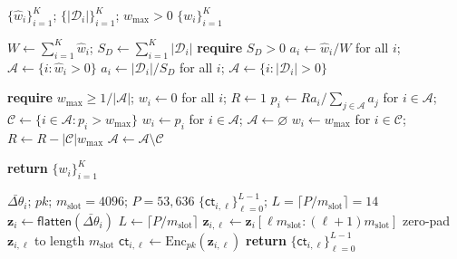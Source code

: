 \documentclass{article}
\begin{document}
\begin{algorithm}[H]
  \caption{\textsc{TrustWeightNorm}}
  \label{alg:trust_weight_norm}
  \begin{algorithmic}[1]
  \REQUIRE $\{\hat w_i\}_{i=1}^{K}$;
  $\{|\mathcal{D}_i|\}_{i=1}^{K}$;
  $w_{\max}>0$
  \ENSURE $\{w_i\}_{i=1}^{K}$

  \STATE $W\leftarrow\sum_{i=1}^{K}\hat w_i$;
  $S_D\leftarrow\sum_{i=1}^{K}|\mathcal D_i|$
  \STATE \textbf{require} $S_D>0$
    \STATE $a_i\leftarrow\hat w_i/W$ for all $i$;
    $\mathcal A\leftarrow\{i:\hat w_i>0\}$
  \ELSE
    \STATE $a_i\leftarrow|\mathcal D_i|/S_D$ for all $i$;
    $\mathcal A\leftarrow\{i:|\mathcal D_i|>0\}$
  \ENDIF

  \STATE \textbf{require} $w_{\max}\geq1/|\mathcal A|$;
  $w_i\leftarrow0$ for all $i$; $R\leftarrow1$
    \STATE $p_i\leftarrow R a_i/\sum_{j\in\mathcal A}a_j$
    for $i\in\mathcal A$;
    $\mathcal C\leftarrow\{i\in\mathcal A:p_i>w_{\max}\}$
      \STATE $w_i\leftarrow p_i$ for $i\in\mathcal A$;
      $\mathcal A\leftarrow\varnothing$
    \ELSE
      \STATE $w_i\leftarrow w_{\max}$ for $i\in\mathcal C$;
      $R\leftarrow R-|\mathcal C|w_{\max}$
      \STATE $\mathcal A\leftarrow\mathcal A\setminus\mathcal C$
    \ENDIF
  \ENDWHILE

  \STATE \textbf{return} $\{w_i\}_{i=1}^{K}$
  \end{algorithmic}
\end{algorithm}

\begin{algorithm}[H]
  \caption{\textsc{CKKSEncryptDelta} at $\mathcal{DC}_i$}
  \label{alg:ckksenc}
  \begin{algorithmic}[1]
  \REQUIRE $\bar{\Delta\theta}_i$; $pk$; $m_{\mathrm{slot}}=4096$; $P=53{,}636$
  \ENSURE $\{\mathsf{ct}_{i,\ell}\}_{\ell=0}^{L-1}$; $L=\lceil P/m_{\mathrm{slot}}\rceil=14$
  \STATE $\mathbf{z}_i\leftarrow\mathsf{flatten}(\bar{\Delta\theta}_i)$
  \STATE $L\leftarrow\lceil P/m_{\mathrm{slot}}\rceil$
    \STATE $\mathbf{z}_{i,\ell}\leftarrow\mathbf{z}_i[\ell m_{\mathrm{slot}}:(\ell+1)m_{\mathrm{slot}}]$
      \STATE zero-pad $\mathbf{z}_{i,\ell}$ to length $m_{\mathrm{slot}}$
    \ENDIF
    \STATE $\mathsf{ct}_{i,\ell}\leftarrow\mathrm{Enc}_{pk}(\mathbf{z}_{i,\ell})$
  \ENDFOR
  \STATE \textbf{return} $\{\mathsf{ct}_{i,\ell}\}_{\ell=0}^{L-1}$
  \end{algorithmic}
  \end{algorithm}
\end{document}
